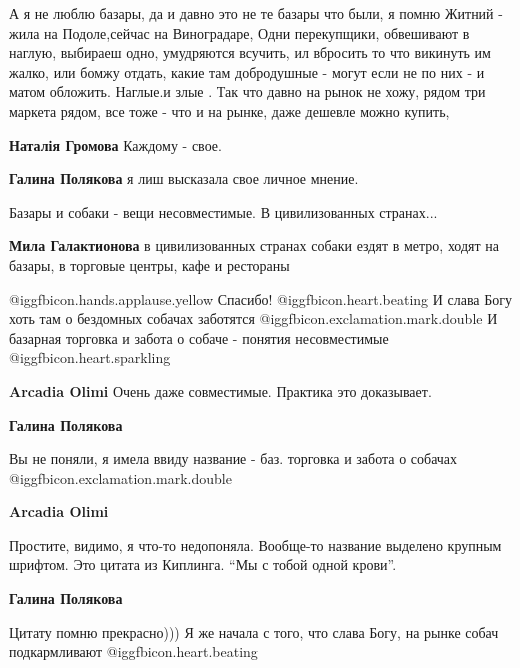 \begin{itemize}

А я не люблю базары, да и давно это не те базары что были, я помню Житний -
жила на Подоле,сейчас на Виноградаре, Одни перекупщики, обвешивают в наглую,
выбираеш одно, умудряются всучить, ил вбросить то что викинуть им жалко, или
бомжу отдать, какие там добродушные - могут если не по них - и матом обложить.
Наглые.и злые . Так что давно на рынок не хожу, рядом три маркета рядом, все
тоже - что и на рынке, даже дешевле можно купить,

\begin{itemize} %
\textbf{Наталія Громова} Каждому - свое.

\textbf{Галина Полякова} я лиш высказала свое личное мнение.
\end{itemize} %

Базары и собаки - вещи несовместимые. В цивилизованных странах...

\begin{itemize} %
\textbf{Мила Галактионова} в цивилизованных странах собаки ездят в метро, ходят на базары, в торговые центры, кафе и рестораны
\end{itemize} %


 @igg{fbicon.hands.applause.yellow} Спасибо!  @igg{fbicon.heart.beating} 
И слава Богу хоть там о бездомных собачах заботятся @igg{fbicon.exclamation.mark.double}
И базарная торговка и забота о собаче - понятия несовместимые  @igg{fbicon.heart.sparkling} 

\begin{itemize} %
\textbf{Arcadia Olimi} Очень даже совместимые. Практика это доказывает.

\textbf{Галина Полякова} 

Вы не поняли, я имела ввиду название - баз. торговка и забота о собачах
@igg{fbicon.exclamation.mark.double}

\textbf{Arcadia Olimi} 

Простите, видимо, я что-то недопоняла. Вообще-то название выделено крупным
шрифтом. Это цитата из Киплинга. \enquote{Мы с тобой одной крови}.

\textbf{Галина Полякова}

Цитату помню прекрасно)))
Я же начала с того, что слава Богу, на рынке собач подкармливают  @igg{fbicon.heart.beating} 
\end{itemize} %


\end{itemize}
